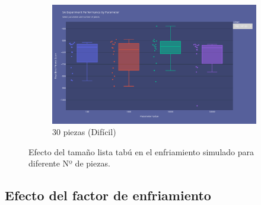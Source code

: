 \documentclass[11pt,spanish,listoffigures,listoftables]{tfgetsinf}
\begin{document}
\begin{figure}[H]
    \begin{subfigure}[b]{0.48\textwidth}
        \centering
        \includegraphics[width=\textwidth]{images/SA_np-30_tabu.png}
        \caption{30 piezas (Difícil)}
        \label{fig:sa_np30_tabu}
    \end{subfigure}
    \caption{Efecto del tamaño lista tabú en el enfriamiento simulado para diferente Nº de piezas.}
    \label{fig:sa_tabu}
\end{figure}

\subsection{Efecto del factor de enfriamiento}

\end{document}
